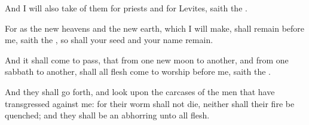 \Verse And I will also take of them for priests and for Levites, saith the \LORD.

\Verse For as the new heavens and the new earth, which I will make, shall remain before me, saith the \LORD, so shall your seed and your name remain.

\Verse And it shall come to pass, that from one new moon to another, and from one sabbath to another, shall all flesh come to worship before me, saith the \LORD.

\Verse And they shall go forth, and look upon the carcases of the men that have transgressed against me: for their worm shall not die, neither shall their fire be quenched; and they shall be an abhorring unto all flesh.

